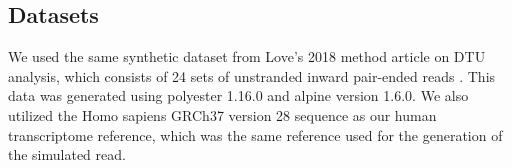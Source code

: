 \subsection{Datasets}

We used the same synthetic dataset from Love’s 2018 method article on DTU analysis, 
which consists of 24 sets of unstranded inward pair-ended reads \cite{love_swimming_2018}. 
This data was generated using polyester 1.16.0 and alpine version 1.6.0. \cite{frazee2015polyester} 
We also utilized the Homo sapiens GRCh37 version 28 sequence as our 
human transcriptome reference, which was the same reference used for the generation 
of the simulated read. \cite{noauthor_homo_sapiens_nodate}

